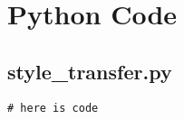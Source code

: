 \chapter{Python Code}
\label{app:code}


\begin{spacing}{1.2}
\section{style\_transfer.py}
\label{sec:code:style_transfer}
\begin{lstlisting}
# here is code
\end{lstlisting}
\end{spacing}